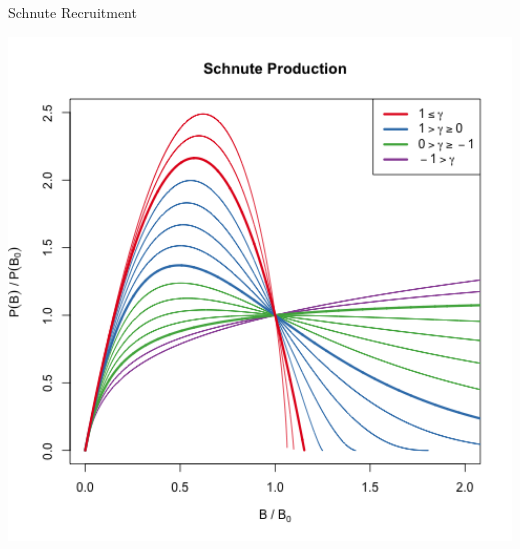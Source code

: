 \documentclass[ xcolor = pdftex, dvipsnames, table ]{beamer}
\begin{document}
\begin{frame}{Schnute Recruitment}
\begin{minipage}[h!]{0.52\textwidth}
        \includegraphics[width=1.1\textwidth]{../../gpBias/g3.png} %
\end{minipage}
\end{frame}

\end{document}
